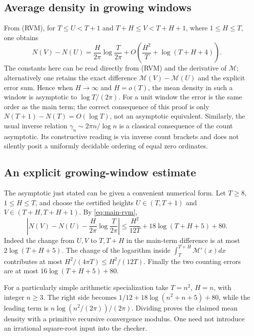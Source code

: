

\subsection{Average density in growing windows}

From (RVM), for $T\le U<T+1$ and
$T+H\le V<T+H+1$, where $1\le H\le T$, one obtains
\[
 N(V)-N(U)=\frac{H}{2\pi}\log\frac T{2\pi}
          +O\left(\frac{H^2}{T}+\log(T+H+4)\right).
\]
The constants here can be read directly from (RVM) and the derivative of
$\mathcal M$; alternatively one retains the exact difference $\mathcal M(V)-\mathcal M(U)$ and the
explicit error sum.  Hence when $H\to\infty$ and $H=o(T)$, the mean density
in such a window is asymptotic to $\log T/(2\pi)$.
For a unit window the error is the same order as the main term; the correct
consequence of this proof is only $N(T+1)-N(T)=O(\log T)$, not an
asymptotic equivalent.  Similarly, the usual inverse relation
$\gamma_n\sim2\pi n/\log n$ is a classical consequence of the count
asymptotic.  Its constructive reading is via inverse count brackets and
does not silently posit a uniformly decidable ordering of equal zero
ordinates.

\subsection{An explicit growing-window estimate}
The asymptotic just stated can be given a convenient numerical form.
Let $T\ge8$, $1\le H\le T$, and choose the certified heights
$U\in(T,T+1)$ and $V\in(T+H,T+H+1)$. By
\eqref{eq:main-rvm},
\begin{equation}
 \left|N(V)-N(U)-\frac{H}{2\pi}\log\frac{T}{2\pi}\right|
 \le\frac{H^2}{12T}+18\log(T+H+5)+80.
 \label{eq:window-explicit}
\end{equation}
Indeed the change from $U,V$ to $T,T+H$ in the main-term difference
is at most $2\log(T+H+5)$. The change of the logarithm inside
$\int_T^{T+H}\mathcal M'(x)dx$ contributes at most
$H^2/(4\pi T)\le H^2/(12T)$. Finally the two counting errors are
at most $16\log(T+H+5)+80$.

For a particularly simple arithmetic specialization take $T=n^2$,
$H=n$, with integer $n\ge3$. The right side becomes
$1/12+18\log(n^2+n+5)+80$, while the leading term is
$n\log(n^2/(2\pi))/(2\pi)$. Dividing proves the claimed mean density
with a primitive recursive convergence modulus. One need not introduce
an irrational square-root input into the checker.

